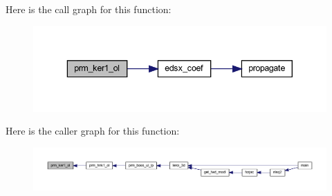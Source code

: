 Here is the call graph for this function\+:\nopagebreak
\begin{figure}[H]
\begin{center}
\leavevmode
\includegraphics[width=343pt]{Leroi_8f90_a98390b637677e60abaa0fa6df3249f0b_cgraph}
\end{center}
\end{figure}
Here is the caller graph for this function\+:\nopagebreak
\begin{figure}[H]
\begin{center}
\leavevmode
\includegraphics[width=350pt]{Leroi_8f90_a98390b637677e60abaa0fa6df3249f0b_icgraph}
\end{center}
\end{figure}
\mbox{\label{Leroi_8f90_a04185f4ba85efc3e493f2de9019a69da}} 
